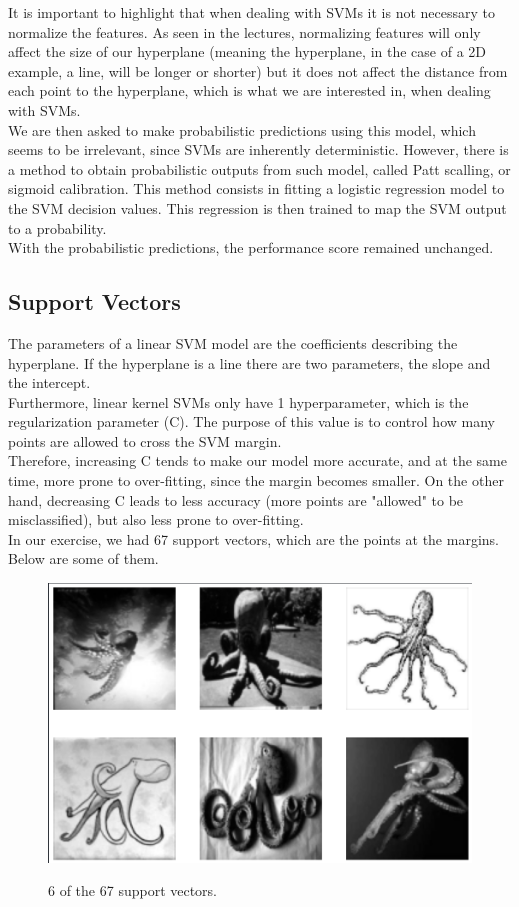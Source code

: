 \documentclass{thesisreport}
\begin{document}
It is important to highlight that when dealing with SVMs it is not necessary to normalize the features. As seen in the lectures, normalizing features will only affect the size of our hyperplane (meaning the hyperplane, in the case of a 2D example, a line, will be longer or shorter) but it does not affect the distance from each point to the hyperplane, which is what we are interested in, when dealing with SVMs.\\
We are then asked to make probabilistic predictions using this model, which seems to be irrelevant, since SVMs are inherently deterministic. However, there is a method to obtain probabilistic outputs from such model, called Patt scalling, or sigmoid calibration. This method consists in fitting a logistic regression model to the SVM decision values. This regression is then trained to map the SVM output to a probability.\\
With the probabilistic predictions, the performance score remained unchanged.

\subsection{Support Vectors}
The parameters of a linear SVM model are the coefficients describing the hyperplane. If the hyperplane is a line there are two parameters, the slope and the intercept.\\ %
Furthermore, linear kernel SVMs only have 1 hyperparameter, which is the regularization parameter (C). The purpose of this value is to control how many points are allowed to cross the SVM margin.\\
Therefore, increasing C tends to make our model more accurate, and at the same time, more prone to over-fitting, since the margin becomes smaller. On the other hand, decreasing C leads to less accuracy (more points are "allowed" to be misclassified), but also less prone to over-fitting.\\
In our exercise, we had 67 support vectors, which are the points at the margins. Below are some of them.\\
    \begin{figure}[htbp]
    \centering
    \includegraphics[scale=0.5]{./figures/supvecs}\\
    \caption{6 of the 67 support vectors.}
    \label{fig:bear 1000}
    \end{figure}
\end{document}
